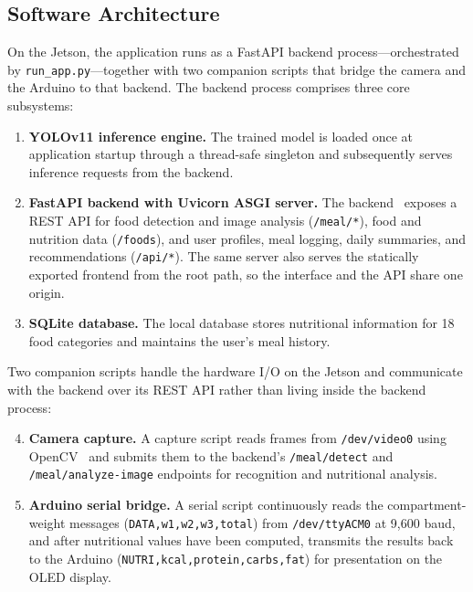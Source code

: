\documentclass[11pt,a4paper]{article}
\begin{document}
\subsection{Software Architecture}

On the Jetson, the application runs as a FastAPI backend process---orchestrated by \texttt{run\_app.py}---together with two companion scripts that bridge the camera and the Arduino to that backend. The backend process comprises three core subsystems:

\begin{enumerate}
  \item \textbf{YOLOv11 inference engine.} The trained model is loaded once at application startup through a thread-safe singleton and subsequently serves inference requests from the backend.
  \item \textbf{FastAPI backend with Uvicorn ASGI server.} The backend~\cite{fastapi} exposes a REST API for food detection and image analysis (\texttt{/meal/*}), food and nutrition data (\texttt{/foods}), and user profiles, meal logging, daily summaries, and recommendations (\texttt{/api/*}). The same server also serves the statically exported frontend from the root path, so the interface and the API share one origin.
  \item \textbf{SQLite database.} The local database stores nutritional information for 18 food categories and maintains the user's meal history.
\end{enumerate}

Two companion scripts handle the hardware I/O on the Jetson and communicate with the backend over its REST API rather than living inside the backend process:

\begin{enumerate}
  \setcounter{enumi}{3}
  \item \textbf{Camera capture.} A capture script reads frames from \texttt{/dev/video0} using OpenCV~\cite{opencv} and submits them to the backend's \texttt{/meal/detect} and \texttt{/meal/analyze-image} endpoints for recognition and nutritional analysis.
  \item \textbf{Arduino serial bridge.} A serial script continuously reads the compartment-weight messages (\texttt{DATA,w1,w2,w3,total}) from \texttt{/dev/ttyACM0} at 9{,}600 baud, and after nutritional values have been computed, transmits the results back to the Arduino (\texttt{NUTRI,kcal,protein,carbs,fat}) for presentation on the OLED display.
\end{enumerate}
\end{document}
